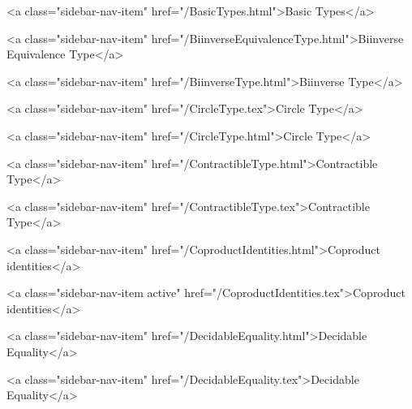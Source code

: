           <a class="sidebar-nav-item" href="/BasicTypes.html">Basic Types</a>
        
      
    
      
        
          <a class="sidebar-nav-item" href="/BiinverseEquivalenceType.html">Biinverse Equivalence Type</a>
        
      
    
      
        
          <a class="sidebar-nav-item" href="/BiinverseType.html">Biinverse Type</a>
        
      
    
      
        
          <a class="sidebar-nav-item" href="/CircleType.tex">Circle Type</a>
        
      
    
      
        
          <a class="sidebar-nav-item" href="/CircleType.html">Circle Type</a>
        
      
    
      
        
          <a class="sidebar-nav-item" href="/ContractibleType.html">Contractible Type</a>
        
      
    
      
        
          <a class="sidebar-nav-item" href="/ContractibleType.tex">Contractible Type</a>
        
      
    
      
        
          <a class="sidebar-nav-item" href="/CoproductIdentities.html">Coproduct identities</a>
        
      
    
      
        
          <a class="sidebar-nav-item active" href="/CoproductIdentities.tex">Coproduct identities</a>
        
      
    
      
        
          <a class="sidebar-nav-item" href="/DecidableEquality.html">Decidable Equality</a>
        
      
    
      
        
          <a class="sidebar-nav-item" href="/DecidableEquality.tex">Decidable Equality</a>
        
